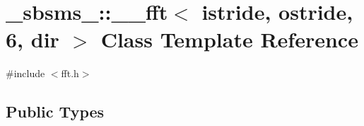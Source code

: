 \hypertarget{class__sbsms___1_1____fft_3_01istride_00_01ostride_00_016_00_01dir_01_4}{}\section{\+\_\+sbsms\+\_\+\+:\+:\+\_\+\+\_\+fft$<$ istride, ostride, 6, dir $>$ Class Template Reference}
\label{class__sbsms___1_1____fft_3_01istride_00_01ostride_00_016_00_01dir_01_4}


{\ttfamily \#include $<$fft.\+h$>$}

\subsection*{Public Types}
